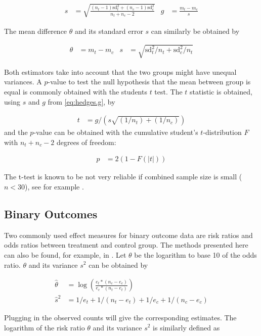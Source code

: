 \documentclass[11pt,a4paper,twoside]{book}\usepackage[]{graphicx}\usepackage[]{color}
\begin{document}
\begin{align}
s &= \sqrt{\frac{(n_t - 1)\textrm{sd}_t^2 + (n_c - 1)\textrm{sd}_c^2}{n_t + n_c - 2}} & g &= \frac{m_t - m_c}{s} \label{eq:hedges.g}
\end{align}

The mean difference $\theta$ and its standard error $s$ can similarly be obtained by

\begin{align}
\theta &= m_t - m_c & s &= \sqrt{\textrm{sd}_t^2/n_t + \textrm{sd}_c^2/n_t}
\end{align}

Both estimators take into account that the two groups might have unequal variances. A $p$-value to test the null hypothesis that the mean between group is equal is commonly obtained with the students $t$ test. The $t$ statistic is obtained, using $s$ and $g$ from \ref{eq:hedges.g}, by

\begin{align}
t &= g/(s\sqrt{(1/n_t)+(1/n_c)}) \nonumber
\end{align}
and the $p$-value can be obtained with the cumulative student's $t$-distribution $F$ with $n_t + n_c - 2$ degrees of freedom:

\begin{align}
p &= 2(1-F(|t|)) \nonumber
\end{align}

The t-test is known to be not very reliable if combined sample size is small ($n < 30$), see for example \citet{t.test}.

\subsection{Binary Outcomes}
Two commonly used effect measures for binary outcome data are risk ratios and odds ratios between treatment and control group. 
The methods presented here can also be found, for example, in \cite[34]{Intro.meta}.
Let $\theta$ be the logarithm to base 10 of the odds ratio. $\theta$ and its variance $s^2$ can be obtained by 

\begin{align}
\hat{\theta} &= \log(\frac{e_t*(n_c - e_c)}{e_c*(n_t - e_t)}) \nonumber \\
\hat{s}^2 &= 1/e_t + 1/(n_t - e_t) + 1/e_c + 1/(n_c - e_c) \nonumber
\end{align}

Plugging in the observed counts will give the corresponding estimates. The logarithm of the risk ratio $\theta$ and its variance $s^2$ is similarly defined as
\end{document}
